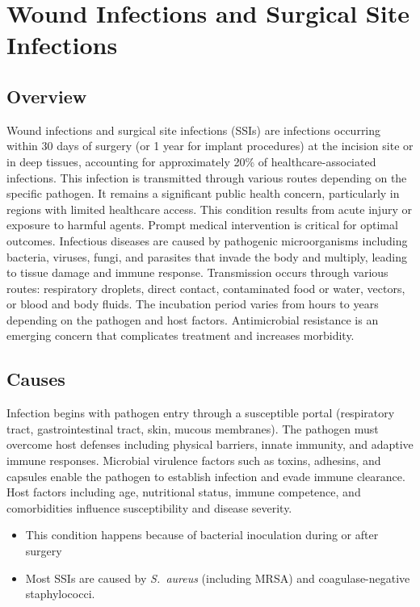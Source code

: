\chapter{Wound Infections and Surgical Site Infections}
\label{sec:Wound Infections and Surgical Site Infections}

\section{Overview}
Wound infections and surgical site infections (SSIs) are infections occurring within 30 days of surgery (or 1 year for implant procedures) at the incision site or in deep tissues, accounting for approximately 20\% of healthcare-associated infections. This infection is transmitted through various routes depending on the specific pathogen. It remains a significant public health concern, particularly in regions with limited healthcare access. This condition results from acute injury or exposure to harmful agents. Prompt medical intervention is critical for optimal outcomes. Infectious diseases are caused by pathogenic microorganisms including bacteria, viruses, fungi, and parasites that invade the body and multiply, leading to tissue damage and immune response. Transmission occurs through various routes: respiratory droplets, direct contact, contaminated food or water, vectors, or blood and body fluids. The incubation period varies from hours to years depending on the pathogen and host factors. Antimicrobial resistance is an emerging concern that complicates treatment and increases morbidity.
\section{Causes}
Infection begins with pathogen entry through a susceptible portal (respiratory tract, gastrointestinal tract, skin, mucous membranes). The pathogen must overcome host defenses including physical barriers, innate immunity, and adaptive immune responses. Microbial virulence factors such as toxins, adhesins, and capsules enable the pathogen to establish infection and evade immune clearance. Host factors including age, nutritional status, immune competence, and comorbidities influence susceptibility and disease severity.

\begin{itemize}[noitemsep]
  \item This condition happens because of bacterial inoculation during or after surgery
  \item Most SSIs are caused by \textit{S.~aureus} (including MRSA) and coagulase-negative staphylococci.
\end{itemize}
